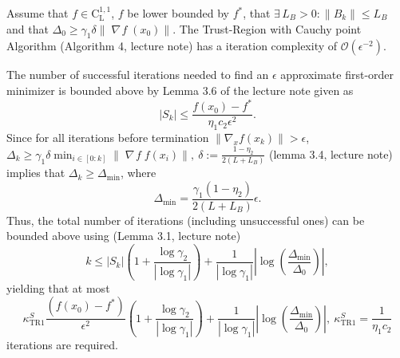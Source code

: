 \documentclass{ExerciseSheet}
\newif\ifsolutions
\newcommand{\LC}{\mathord{\mathrm{C^{1,1}_{L}}}}
\DeclareMathOperator*{\grad}{\mathit{\nabla \!f}}
\newcommand{\BigO}{\mathcal{O}}
\begin{document}
\begin{problem}
    Assume that $f\in \LC$, $f$ be lower bounded by $f^*$, that $\exists\, L_B>0: \|B_k\| \leq L_B$ and that $\Delta_0\geq \gamma_1 \delta \|\grad(x_0)\|$. The Trust-Region with Cauchy point Algorithm (Algorithm 4, lecture note) has a iteration complexity of $\BigO(\epsilon^{-2})$.
\end{problem}
\ifsolutions
\vskip 0.3cm
\begin{solution}
    The number of successful iterations needed to find an $ \epsilon $ approximate first-order minimizer is bounded above by Lemma 3.6 of the lecture note given as \begin{equation}
        |S_k| \leq \dfrac{f(x_0) - f^*}{\eta_1 c_2 \epsilon^2}.
    \end{equation} 
    Since for all iterations before termination $\| \nabla_x f(x_k) \| > \epsilon $, $\Delta_k \geq \gamma_1 \delta \min_{i \in [0:k]}\|\grad f(x_i)\| , \ \delta:=\frac{1-\eta_2}{2(L+L_B)}$ (lemma 3.4, lecture note) implies that $\Delta_k \geq \Delta_{\min} $, where
\begin{equation}
    \Delta_{\min} = \frac{\gamma_1 (1 - \eta_2)}{2 (L + L_B)}\epsilon.
\end{equation}
Thus, the total number of iterations (including unsuccessful ones) can be bounded above using (Lemma 3.1, lecture note)
\[
k \leq |S_k| \left(1 + \frac{\log \gamma_2}{|\log \gamma_1|} \right) + \frac{1}{|\log \gamma_1|} \left| \log \left( \frac{\Delta_{\min}}{\Delta_0} \right) \right|,
\] yielding that at most
\begin{equation}
\kappa^S_{\text{TR1}}  \frac{(f(x_0) - f^*)}{\epsilon^2} \left(1 + \frac{\log \gamma_2}{|\log \gamma_1|}\right) + \frac{1}{|\log \gamma_1|} \left| \log \left(\frac{\Delta_{\min}}{\Delta_0} \right) \right|, \   \kappa^S_{\text{TR1}} = \dfrac{1}{\eta_1 c_2}
\end{equation}
iterations are required.


\end{solution}
\end{document}
